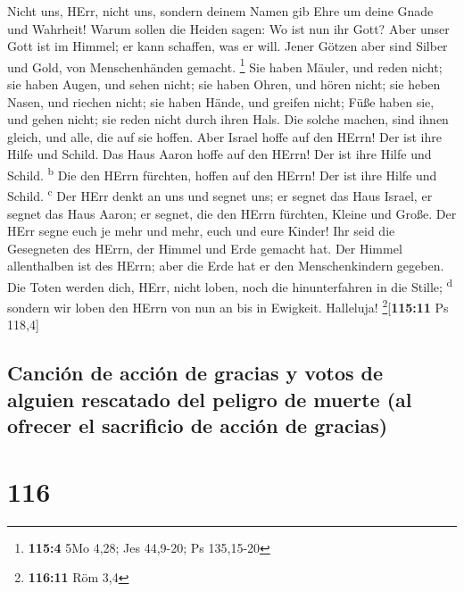  Nicht uns, HErr, nicht uns, sondern deinem Namen gib Ehre
um deine Gnade und Wahrheit!  Warum sollen die Heiden
sagen: Wo ist nun ihr Gott?  Aber unser Gott ist im
Himmel; er kann schaffen, was er will.  Jener Götzen aber
sind Silber und Gold, von Menschenhänden gemacht. \footnote{\textbf{115:4}
  5Mo 4,28; Jes 44,9-20; Ps 135,15-20}  Sie haben Mäuler,
und reden nicht; sie haben Augen, und sehen nicht;  sie
haben Ohren, und hören nicht; sie heben Nasen, und riechen nicht;
 sie haben Hände, und greifen nicht; Füße haben sie, und
gehen nicht; sie reden nicht durch ihren Hals.  Die solche
machen, sind ihnen gleich, und alle, die auf sie hoffen. 
Aber Israel hoffe auf den HErrn! Der ist ihre Hilfe und Schild.
 Das Haus Aaron hoffe auf den HErrn! Der ist ihre Hilfe
und Schild. \textsuperscript{b}  Die den HErrn fürchten,
hoffen auf den HErrn! Der ist ihre Hilfe und Schild. \textsuperscript{c}
 Der HErr denkt an uns und segnet uns; er segnet das Haus
Israel, er segnet das Haus Aaron;  er segnet, die den
HErrn fürchten, Kleine und Große.  Der HErr segne euch je
mehr und mehr, euch und eure Kinder!  Ihr seid die
Gesegneten des HErrn, der Himmel und Erde gemacht hat. 
Der Himmel allenthalben ist des HErrn; aber die Erde hat er den
Menschenkindern gegeben.  Die Toten werden dich, HErr,
nicht loben, noch die hinunterfahren in die Stille; \textsuperscript{d}
 sondern wir loben den HErrn von nun an bis in Ewigkeit.
Halleluja! \footnote{\textbf{116:11} Röm 3,4}{[}\textbf{115:11} Ps
118,4{]}

\hypertarget{canciuxf3n-de-acciuxf3n-de-gracias-y-votos-de-alguien-rescatado-del-peligro-de-muerte-al-ofrecer-el-sacrificio-de-acciuxf3n-de-gracias}{%
\subsection{Canción de acción de gracias y votos de alguien rescatado
del peligro de muerte (al ofrecer el sacrificio de acción de
gracias)}\label{canciuxf3n-de-acciuxf3n-de-gracias-y-votos-de-alguien-rescatado-del-peligro-de-muerte-al-ofrecer-el-sacrificio-de-acciuxf3n-de-gracias}}

\hypertarget{section-115}{%
\section{116}\label{section-115}}

